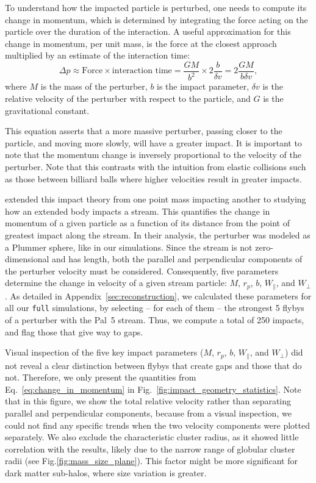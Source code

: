 \documentclass{aa}
\begin{document}
    To understand how the impacted particle is perturbed, one needs to compute its change in momentum, which is determined by integrating the force acting on the particle over the duration of the interaction. A useful approximation for this change in momentum, per unit mass, is the force at the closest approach multiplied by an estimate of the interaction time:
    \begin{equation} \label{eq:change_in_momentum} \Delta p \approx \text{Force} \times \text{interaction time} = \frac{GM}{b^2} \times 2\frac{b}{\delta v} = 2\frac{GM}{b \delta v}, \end{equation}where $M$ is the mass of the perturber, $b$ is the impact parameter, $\delta v$ is the relative velocity of the perturber with respect to the particle, and $G$ is the gravitational constant. 


    This equation asserts that a more massive perturber, passing closer to the particle, and moving more slowly, will have a greater impact. It is important to note that the momentum change is inversely proportional to the velocity of the perturber. Note that this contrasts with the intuition from elastic collisions such as those between billiard balls where higher velocities result in greater impacts.

    \citet{2015MNRAS.450.1136E} extended this impact theory from one point mass impacting another to studying how an extended body impacts a stream. This quantifies the change in momentum of a given particle as a function of its distance from the point of greatest impact along the stream. In their analysis, the perturber was modeled as a Plummer sphere, like in our simulations. Since the stream is not zero-dimensional and has length, both the parallel and perpendicular components of the perturber velocity must be considered. Consequently, five parameters determine the change in velocity of a given stream particle: $M$, $r_p$, $b$, $W_\parallel$, and $W_\perp$. As detailed in Appendix~\ref{sec:reconstruction}, we calculated these parameters for all our \texttt{full} simulations, by selecting -- for each of them --  the strongest 5 flybys of a perturber with the Pal~5 stream. Thus, we compute a total of  250 impacts, and flag those that give way to gaps. 


    Visual inspection of the five key impact parameters ($M$, $r_p$, $b$, $W_\parallel$, and $W_\perp$) did not reveal a clear distinction between flybys that create gaps and those that do not. Therefore, we only present the quantities from Eq.~\ref{eq:change_in_momentum} in Fig.~\ref{fig:impact_geometry_statistics}. 
    Note that in this figure, we show the total relative velocity rather than separating parallel and perpendicular components, because from a visual inspection, we could not find any specific trends when the two velocity components were plotted separately. We also exclude the characteristic cluster radius, as it showed little correlation with the results, likely due to the narrow range of globular cluster radii (see Fig.\ref{fig:mass_size_plane}). This factor might be more significant for dark matter sub-halos, where size variation is greater.
      
\end{document}
